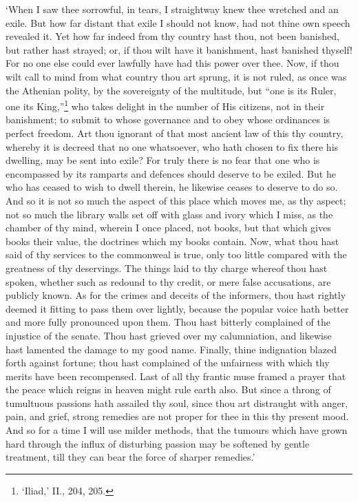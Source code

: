 \documentclass[12pt]{book}
\begin{document}
`When I saw thee sorrowful, in tears, I straightway knew thee wretched
and an exile. But how far distant that exile I should not know, had not
thine own speech revealed it. Yet how far indeed from thy country hast
thou, not been banished, but rather hast strayed; or, if thou wilt have
it banishment, hast banished thyself! For no one else could ever
lawfully have had this power over thee. Now, if thou wilt call to mind
from what country thou art sprung, it is not ruled, as once was the
Athenian polity, by the sovereignty of the multitude, but ``one is its
Ruler, one its King,''\footnote{‘Iliad,’ II., 204, 205.} who takes delight in the number of His citizens,
not in their banishment; to submit to whose governance and to obey
whose ordinances is perfect freedom. Art thou ignorant of that most
ancient law of this thy country, whereby it is decreed that no one
whatsoever, who hath chosen to fix there his dwelling, may be sent into
exile? For truly there is no fear that one who is encompassed by its
ramparts and defences should deserve to be exiled. But he who has ceased
to wish to dwell therein, he likewise ceases to deserve to do so. And so
it is not so much the aspect of this place which moves me, as thy
aspect; not so much the library walls set off with glass and ivory which
I miss, as the chamber of thy mind, wherein I once placed, not books,
but that which gives books their value, the doctrines which my books
contain. Now, what thou hast said of thy services to the commonweal is
true, only too little compared with the greatness of thy deservings. The
things laid to thy charge whereof thou hast spoken, whether such as
redound to thy credit, or mere false accusations, are publicly known. As
for the crimes and deceits of the informers, thou hast rightly deemed
it fitting to pass them over lightly, because the popular voice hath
better and more fully pronounced upon them. Thou hast bitterly
complained of the injustice of the senate. Thou hast grieved over my
calumniation, and likewise hast lamented the damage to my good name.
Finally, thine indignation blazed forth against fortune; thou hast
complained of the unfairness with which thy merits have been
recompensed. Last of all thy frantic muse framed a prayer that the peace
which reigns in heaven might rule earth also. But since a throng of
tumultuous passions hath assailed thy soul, since thou art distraught
with anger, pain, and grief, strong remedies are not proper for thee in
this thy present mood. And so for a time I will use milder methods, that
the tumours which have grown hard through the influx of disturbing
passion may be softened by gentle treatment, till they can bear the
force of sharper remedies.'
\end{document}
